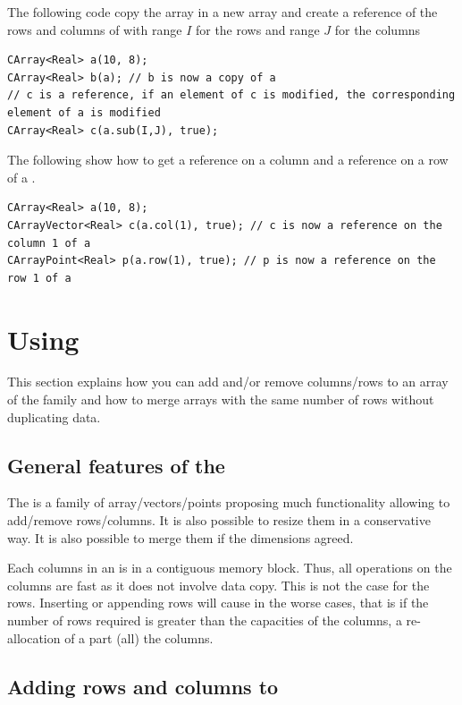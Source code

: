 \documentclass[a4paper,10pt]{article}
\begin{document}
The following code copy the array  in a new array  and create a
reference of the rows and columns of  with range $I$ for the rows and
range $J$ for the columns
\begin{lstlisting}[style=customcpp]
CArray<Real> a(10, 8);
CArray<Real> b(a); // b is now a copy of a
// c is a reference, if an element of c is modified, the corresponding element of a is modified
CArray<Real> c(a.sub(I,J), true);
\end{lstlisting}
The following show how to get a reference on a column and a reference on a row of a .
\begin{lstlisting}[style=customcpp]
CArray<Real> a(10, 8);
CArrayVector<Real> c(a.col(1), true); // c is now a reference on the column 1 of a
CArrayPoint<Real> p(a.row(1), true); // p is now a reference on the row 1 of a
\end{lstlisting}

\section{Using }

This section explains how you can add and/or remove columns/rows to an array of
the  family and how to merge arrays with the same number of rows
without duplicating data.

\subsection{General features of the }

The  is a family of array/vectors/points proposing much
functionality allowing to add/remove rows/columns. It is also possible to
resize them in a conservative way. It is also possible to merge them if the
dimensions agreed.

Each columns in an  is in a contiguous memory block. Thus, all
operations on the columns are fast as it does not involve data copy. This is not
the case for the rows. Inserting or appending rows will cause in the worse cases,
that is if the number of rows required is greater than the capacities of the columns,
a re-allocation of a part (all) the columns.

\subsection{Adding rows and columns to }
\end{document}
